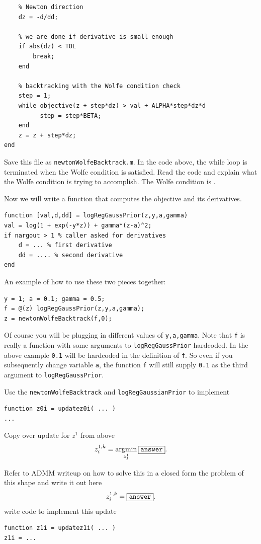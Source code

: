 \documentclass{article}
\begin{document}
{\begin{verbatim}
    % Newton direction
    dz = -d/dd;

    % we are done if derivative is small enough
    if abs(dz) < TOL
        break;
    end

    % backtracking with the Wolfe condition check
    step = 1;
    while objective(z + step*dz) > val + ALPHA*step*dz*d
          step = step*BETA;
    end
    z = z + step*dz;
end
\end{verbatim}
Save this file as \texttt{newtonWolfeBacktrack.m}. In the code above, the while loop is terminated when the Wolfe condition is satisfied. Read the code and explain what the Wolfe condition is trying to accomplish. The Wolfe condition is \answer.

Now we will write a function that computes the objective and its derivatives.
\begin{verbatim}
function [val,d,dd] = logRegGaussPrior(z,y,a,gamma)
val = log(1 + exp(-y*z)) + gamma*(z-a)^2;
if nargout > 1 % caller asked for derivatives
    d = ... % first derivative
    dd = .... % second derivative
end
\end{verbatim}

An example of how to use these two pieces together:
\begin{verbatim}
y = 1; a = 0.1; gamma = 0.5;
f = @(z) logRegGaussPrior(z,y,a,gamma);
z = newtonWolfeBacktrack(f,0);
\end{verbatim}
Of course you will be plugging in different values of \texttt{y,a,gamma}. Note that \texttt{f} is really a function with some arguments to \texttt{logRegGaussPrior} hardcoded. In the above example \texttt{0.1} will be hardcoded in the definition of \texttt{f}.  So even if you subsequently change variable \texttt{a}, the function \texttt{f} will still supply \texttt{0.1} as the third argument to \texttt{logRegGaussPrior}.

Use the \texttt{newtonWolfeBacktrack} and \texttt{logRegGaussianPrior} to implement
\begin{verbatim}
function z0i = updatez0i( ... )
...
\end{verbatim}

\newproblem{1pt} Copy over update for $z^1$ from above
\[
z_i^{1,k} = \mathop{\rm argmin}_{z_I^1}   \fbox{\tt answer}.
\]

Refer to ADMM writeup on how to solve this in a closed form the problem of this shape and write it out here
\[
z_i^{1,k} = \fbox{\tt answer}.
\]
write code to implement this update
\begin{verbatim}
function z1i = updatez1i( ... )
z1i = ...
\end{verbatim}

}
\end{document}
